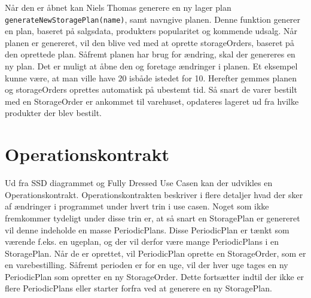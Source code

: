 Når den er åbnet kan Niels Thomas generere en ny lager plan \verb|generateNewStoragePlan(name)|, samt navngive planen. Denne funktion generer en plan, baseret på salgsdata, produkters popularitet og kommende udsalg. Når planen er genereret, vil den blive ved med at oprette storageOrders, baseret på den oprettede plan. 
Såfremt planen har brug for ændring, skal der genereres en ny plan. Det er muligt at åbne den og foretage ændringer i planen. Et eksempel kunne være, at man ville have 20 isbåde istedet for 10. Herefter gemmes planen og storageOrders oprettes automatisk på ubestemt tid. 
Så snart de varer bestilt med en StorageOrder er ankommet til varehuset, opdateres lageret ud fra hvilke produkter der blev bestilt.

\section{Operationskontrakt}
Ud fra SSD diagrammet og Fully Dressed Use Casen kan der udvikles en Operationskontrakt\cite{Larman2004}. Operationskontrakten beskriver i flere detaljer hvad der sker af ændringer i programmet under hvert trin i use casen. Noget som ikke fremkommer tydeligt under disse trin er, at så snart en StoragePlan er genereret vil denne indeholde en masse PeriodicPlans. Disse PeriodicPlan er tænkt som værende f.eks. en ugeplan, og der vil derfor være mange PeriodicPlans i en StoragePlan. Når de er oprettet, vil PeriodicPlan oprette en StorageOrder, som er en varebestilling. Såfremt perioden er for en uge, vil der hver uge tages en ny PeriodicPlan som opretter en ny StorageOrder. Dette fortsætter indtil der ikke er flere PeriodicPlans eller starter forfra ved at generere en ny StoragePlan.

